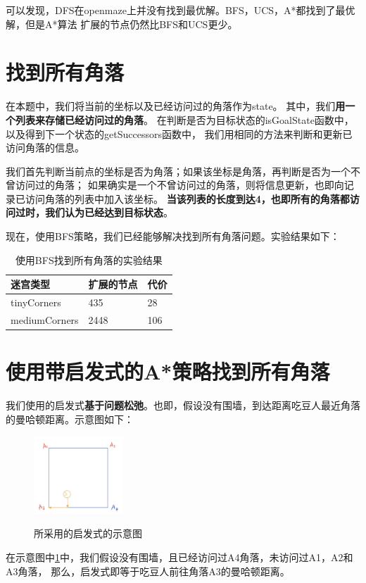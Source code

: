 \documentclass{article}
\begin{document}
可以发现，DFS在openmaze上并没有找到最优解。BFS，UCS，A*都找到了最优解，但是A*算法
扩展的节点仍然比BFS和UCS更少。

\section{找到所有角落}
在本题中，我们将当前的坐标以及已经访问过的角落作为state。
其中，我们\textbf{用一个列表来存储已经访问过的角落}。
在判断是否为目标状态的isGoalState函数中，以及得到下一个状态的getSuccessors函数中，
我们用相同的方法来判断和更新已访问角落的信息。

我们首先判断当前点的坐标是否为角落；如果该坐标是角落，再判断是否为一个不曾访问过的角落；
如果确实是一个不曾访问过的角落，则将信息更新，也即向记录已访问角落的列表中加入该坐标。
\textbf{当该列表的长度到达4，也即所有的角落都访问过时，我们认为已经达到目标状态}。

现在，使用BFS策略，我们已经能够解决找到所有角落问题。实验结果如下：
\begin{table}[H]
	\centering
	\caption{使用BFS找到所有角落的实验结果}
	\begin{tabular}{lll}
		\hline
	迷宫类型          & 扩展的节点 & 代价  \\ \hline
	tinyCorners   & 435   & 28  \\
	mediumCorners & 2448  & 106\\ \hline
	\end{tabular}
	\end{table}

\section{使用带启发式的A*策略找到所有角落}
我们使用的启发式\textbf{基于问题松弛}。也即，假设没有围墙，到达距离吃豆人最近角落
的曼哈顿距离。示意图如下：
\begin{figure}[H]
	\centering
	{\includegraphics[width=0.3\textwidth]{image//启发式示意图.jpg}} 
	\caption{所采用的启发式的示意图}\label{Hfunc}
\end{figure}

在示意图中\ref{Hfunc}中，我们假设没有围墙，且已经访问过A4角落，未访问过A1，A2和A3角落，
那么，启发式即等于吃豆人前往角落A3的曼哈顿距离。
\end{document}
